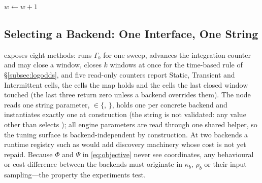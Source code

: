 \begin{algorithm}[t]
\caption{ for : one layered update per closed window, as in  (Algorithm~\ref{alg:endwindowsprt} is the sequential model)}\label{alg:endwindow}
$w\gets w+1$\;
\end{algorithm}

\subsection{Selecting a Backend: One Interface, One String}\label{subsec:select}

 exposes eight methods:  runs $\Gamma_b$ for one sweep,  advances the integration counter and may close a window,  closes $k$ windows at once for the time-based rule of \S\ref{subsec:logodds}, and five read-only counters report Static, Transient and Intermittent cells, the cells the map holds and the cells the last closed window touched (the last three return zero unless a backend overrides them). The node reads one string parameter,  $\in\{$, $\}$, holds one  per concrete backend and instantiates exactly one at construction (the string is not validated: any value other than  selects ); all engine parameters are read through one shared helper, so the tuning surface is backend-independent by construction. At two backends a runtime  registry such as  \citep{ros2pluginlib} would add discovery machinery whose cost is not yet repaid. Because $\Phi$ and $\Psi$ in \eqref{eq:objective} never see coordinates, any behavioural or cost difference between the backends must originate in $\kappa_b$, $\rho_b$ or their input sampling---the property the experiments test.


